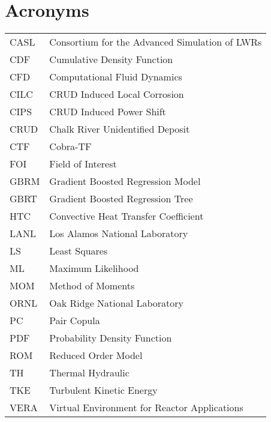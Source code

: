 
\section*{Acronyms}
\begin{tabular}{l l}
CASL & Consortium for the Advanced Simulation of LWRs \\
CDF  & Cumulative Density Function \\
CFD &  Computational Fluid Dynamics \\
CILC & CRUD Induced Local Corrosion \\
CIPS & CRUD Induced Power Shift \\
CRUD & Chalk River Unidentified Deposit \\
CTF &  Cobra-TF \\
FOI &  Field of Interest \\
GBRM & Gradient Boosted Regression Model \\
GBRT & Gradient Boosted Regression Tree \\
HTC  & Convective Heat Transfer Coefficient \\
LANL & Los Alamos National Laboratory \\
LS  &  Least Squares \\
ML  &  Maximum Likelihood \\
MOM &  Method of Moments \\
ORNL & Oak Ridge National Laboratory \\
PC  &  Pair Copula \\
PDF  &  Probability Density Function \\
ROM &  Reduced Order Model \\
TH  &  Thermal Hydraulic \\
TKE &  Turbulent Kinetic Energy \\
VERA & Virtual Environment for Reactor Applications \\
\end{tabular}

